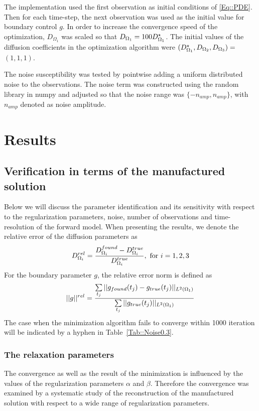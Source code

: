 \documentclass[12pt,a4paper]{article}
\begin{document}
The implementation used the first observation as initial conditions of \eqref{Eq::PDE}. Then for each time-step, the next observation was used as the initial value for boundary control $g$. In order to increase the convergence speed of the optimization, $D_{\Omega_1}$ was scaled so that $D_{\Omega_1} = 100 D_{\Omega_1}\sp{\star} $. The initial values of the diffusion coefficients in the optimization algorithm were $(D_{\Omega_1}\sp{\star}, D_{\Omega_2}, D_{\Omega_3})=$  $(1, 1, 1)$. 

The noise susceptibility was tested by pointwise adding a uniform distributed noise to the observations. The noise term was constructed using the random library in numpy and adjusted so that the noise range was $\lbrace -n_{amp} , n_{amp} \rbrace $, with $n_{amp}$ denoted as noise amplitude.


\section{Results}
\subsection{Verification in terms of the manufactured solution}
Below we will discuss the parameter identification and its sensitivity with respect to the regularization parameters, noise, number of observations and time-resolution of the forward model. When presenting the results, we denote the relative error of the diffusion parameters as 
\begin{equation}
 D_{\Omega_i}\sp{rel} = \frac{D_{\Omega_i}\sp{found} -D_{\Omega_i}\sp{true} }{D_{\Omega_i}\sp{true} }, \text{ for } i=1,2,3
\end{equation}
For the boundary parameter $g$, the relative error norm is defined as 
\begin{equation}
|| g ||\sp{rel} = \frac{ \sum\limits_{t_j} || g_{found}(t_j) -g_{true}(t_j)||_{L^2(\Omega_1)} }{  \sum\limits_{t_j}||g_{true}(t_j)||_{L^2(\Omega_1)} }
\end{equation}
The case when the minimization algorithm fails to converge within 1000 iteration will be indicated by a hyphen in Table~\ref{Tab::Noise0.3}.



\subsubsection{The relaxation parameters}
The convergence as well as the result of the minimization is influenced by the values of the regularization parameters $\alpha$ and $\beta$. Therefore the convergence was examined by a systematic study of the reconstruction of the manufactured solution with respect to a wide range of regularization parameters. 
\end{document}
